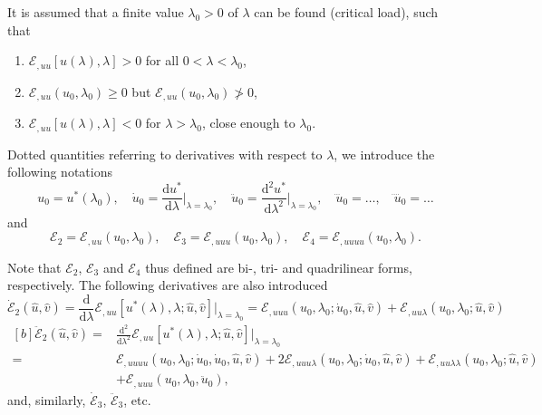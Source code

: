 \documentclass[12pt, final]{scrartcl}
\theoremstyle{definition}
\newcommand{\E}{\mathcal E}
\newcommand{\D}{\mathrm{d}}
\begin{document}
It is assumed that a finite value \(\lambda_0 > 0\) of \(\lambda\) can be found (critical load), such that
\begin{enumerate}
\item \label{item:20221017185946} \(\E_{,uu}[u(\lambda), \lambda] > 0\) for all \(0 < \lambda < \lambda_0\),
\item \label{item:20221017190357} \(\E_{,uu}(u_0, \lambda_0) \geq 0\) but \(\E_{,uu}(u_0, \lambda_0) \ngtr 0\),
\item \label{item:20221017190003} \(\E_{,uu}[u(\lambda), \lambda] < 0\) for \(\lambda > \lambda_0\), close enough to \(\lambda_0\).
\end{enumerate}

Dotted quantities referring to derivatives with respect to \(\lambda\), we introduce the following notations
\begin{equation}
  u_0 = u^\ast(\lambda_0), \quad \dot{u}_0 = \frac{\D u^\ast}{\D \lambda} \biggr \rvert_{\lambda=\lambda_0}, \quad \ddot{u}_0 = \frac{\D^2 u^\ast}{\D \lambda^2} \biggr \rvert_{\lambda=\lambda_0}, \quad \dddot{u}_0 = \ldots, \quad \ddddot{u}_0 = \ldots
\end{equation}
and
\begin{equation}
  \E_2 = \E_{,uu}(u_0, \lambda_0), \quad \E_3 = \E_{,uuu}(u_0, \lambda_0), \quad \E_4 = \E_{,uuuu}(u_0, \lambda_0).
\end{equation}

Note that \(\E_2\), \(\E_3\) and \(\E_4\) thus defined are bi-, tri- and quadrilinear forms, respectively. The following
derivatives are also introduced
\begin{equation}
  \label{eq:20221227184821}
  \dot{\E}_2(\hat{u}, \hat{v}) = \frac{\D}{\D\lambda} \E_{,uu}[ u^\ast(\lambda), \lambda; \hat{u}, \hat{v}] \biggr \rvert_{\lambda = \lambda_0}
  = \E_{,uuu}(u_0, \lambda_0; \dot{u}_0, \hat{u}, \hat{v}) + \E_{,uu\lambda}(u_0, \lambda_0; \hat{u}, \hat{v})
\end{equation}
\begin{equation}
  \begin{aligned}[b]
    \ddot{\E}_2(\hat{u}, \hat{v})
    ={} & \frac{\D^2}{\D\lambda^2} \E_{,uu}[ u^\ast(\lambda), \lambda; \hat{u}, \hat{v}] \biggr \rvert_{\lambda = \lambda_0}\\
    ={} & \E_{,uuuu}(u_0, \lambda_0; \dot{u}_0, \dot{u}_0, \hat{u}, \hat{v}) + 2\E_{,uuu\lambda}(u_0, \lambda_0; \dot{u}_0, \hat{u}, \hat{v}) + \E_{,uu\lambda\lambda}( u_0, \lambda_0; \hat{u}, \hat{v})\\
    & +\E_{,uuu}(u_0, \lambda_0, \ddot{u}_0),
  \end{aligned}
\end{equation}
and, similarly, \(\dot{\E}_3\), \(\ddot{\E}_3\), etc.
\end{document}
